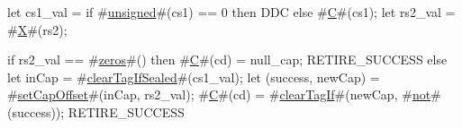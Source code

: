 let cs1_val = if #\hyperref[sailRISCVzunsigned]{unsigned}#(cs1) == 0 then DDC else #\hyperref[sailRISCVzC]{C}#(cs1);
let rs2_val = #\hyperref[sailRISCVzX]{X}#(rs2);

if rs2_val == #\hyperref[sailRISCVzzzeros]{zeros}#() then {
  #\hyperref[sailRISCVzC]{C}#(cd) = null_cap;
  RETIRE_SUCCESS
} else {
  let inCap = #\hyperref[sailRISCVzclearTagIfSealed]{clearTagIfSealed}#(cs1_val);
  let (success, newCap) = #\hyperref[sailRISCVzsetCapOffset]{setCapOffset}#(inCap, rs2_val);
  #\hyperref[sailRISCVzC]{C}#(cd) = #\hyperref[sailRISCVzclearTagIf]{clearTagIf}#(newCap, #\hyperref[sailRISCVznot]{not}#(success));
  RETIRE_SUCCESS
}
